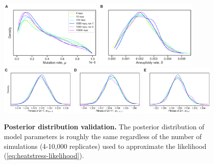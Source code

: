 \documentclass[12pt]{extarticle}
\begin{document}
\begin{figure}[h]
    \centering
      \includegraphics[width=0.45\textwidth]{../figures/runs-A.pdf}      
      \includegraphics[width=0.45\textwidth]{../figures/runs-B.pdf}    
      \includegraphics[width=0.325\textwidth]{../figures/runs-C.pdf}      
      \includegraphics[width=0.325\textwidth]{../figures/runs-D.pdf}      
      \includegraphics[width=0.325\textwidth]{../figures/runs-E.pdf} 
       \caption{
    \textbf{Posterior distribution validation.}
    The posterior distribution of model parameters is roughly the same regardless of the number of simulations (4-10,000 replicates) used to approximate the likelihood (\cref{eq:heatstress-likelihood}).
    } 
     
     \label{fig:seeds}
 \end{figure}
\end{document}
